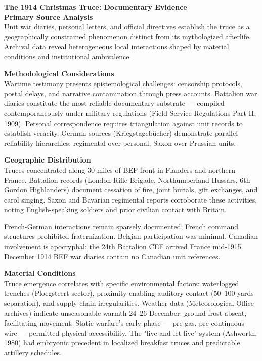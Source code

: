 \begin{technical}
{\Large\textbf{The 1914 Christmas Truce: Documentary Evidence}}\\[0.7em]

\noindent\textbf{Primary Source Analysis}\\[0.5em]
Unit war diaries, personal letters, and official directives establish the truce as a geographically constrained phenomenon distinct from its mythologized afterlife. Archival data reveal heterogeneous local interactions shaped by material conditions and institutional ambivalence.

\noindent\textbf{Methodological Considerations}\\[0.5em]
Wartime testimony presents epistemological challenges: censorship protocols, postal delays, and narrative contamination through press accounts. Battalion war diaries constitute the most reliable documentary substrate — compiled contemporaneously under military regulations (Field Service Regulations Part II, 1909). Personal correspondence requires triangulation against unit records to establish veracity. German sources (Kriegstagebücher) demonstrate parallel reliability hierarchies: regimental over personal, Saxon over Prussian units.

\noindent\textbf{Geographic Distribution}\\[0.5em]
Truces concentrated along 30 miles of BEF front in Flanders and northern France. Battalion records (London Rifle Brigade, Northumberland Hussars, 6th Gordon Highlanders) document cessation of fire, joint burials, gift exchanges, and carol singing. Saxon and Bavarian regimental reports corroborate these activities, noting English-speaking soldiers and prior civilian contact with Britain.

French-German interactions remain sparsely documented; French command structures prohibited fraternization. Belgian participation was minimal. Canadian involvement is apocryphal: the 24th Battalion CEF arrived France mid-1915. December 1914 BEF war diaries contain no Canadian unit references.

\noindent\textbf{Material Conditions}\\[0.5em]
Truce emergence correlates with specific environmental factors: waterlogged trenches (Ploegsteert sector), proximity enabling auditory contact (50–100 yards separation), and supply chain irregularities. Weather data (Meteorological Office archives) indicate unseasonable warmth 24–26 December: ground frost absent, facilitating movement. Static warfare's early phase — pre-gas, pre-continuous wire — permitted physical accessibility. The "live and let live" system (Ashworth, 1980) had embryonic precedent in localized breakfast truces and predictable artillery schedules.


\end{technical}
